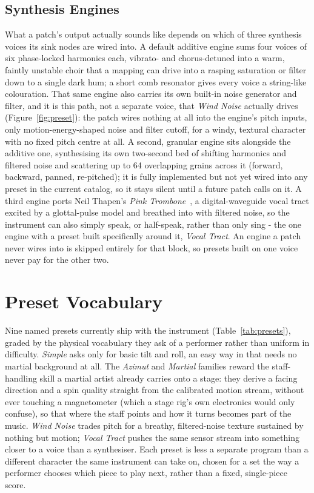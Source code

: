 \documentclass[a4paper,10pt,oneside]{article}
\newcommand{\preset}[1]{\textit{#1}}
\begin{document}
\begin{sloppy}
\subsection{Synthesis Engines}
\label{ssec:engines}

What a patch's output actually sounds like depends on which of three synthesis voices
its sink nodes are wired into. A default additive engine sums four voices of six
phase-locked harmonics each, vibrato- and chorus-detuned into a warm, faintly unstable
choir that a mapping can drive into a rasping saturation or filter down to a single dark
hum; a short comb resonator gives every voice a string-like colouration. That same engine
also carries its own built-in noise generator and filter, and it is this path, not a
separate voice, that \preset{Wind Noise} actually drives (Figure~\ref{fig:preset}): the
patch wires nothing at all into the engine's pitch inputs, only motion-energy-shaped
noise and filter cutoff, for a windy, textural character with no fixed pitch centre at
all. A second, granular engine sits alongside the additive one, synthesising its own
two-second bed of shifting harmonics and filtered noise and scattering up to 64
overlapping grains across it (forward, backward, panned, re-pitched); it is fully
implemented but not yet wired into any preset in the current catalog, so it stays silent
until a future patch calls on it. A third engine ports Neil Thapen's \emph{Pink
Trombone}~\cite{thapen2017pinktrombone}, a digital-waveguide vocal tract excited by a
glottal-pulse model and breathed into with filtered noise, so the instrument can also
simply speak, or half-speak, rather than only sing - the one engine with a preset built
specifically around it, \preset{Vocal Tract}. An engine a patch never wires into is
skipped entirely for that block, so presets built on one voice never pay for the other
two.

\section{Preset Vocabulary}
\label{sec:presets}

Nine named presets currently ship with the instrument (Table~\ref{tab:presets}), graded
by the physical vocabulary they ask of a performer rather than uniform in difficulty.
\preset{Simple} asks only for basic tilt and roll, an easy way in that needs no martial
background at all. The \preset{Azimut} and \preset{Martial} families reward the
staff-handling skill a martial artist already carries onto a stage: they derive a facing
direction and a spin quality straight from the calibrated motion stream, without ever
touching a magnetometer (which a stage rig's own electronics would only confuse), so
that where the staff points and how it turns becomes part of the music. \preset{Wind
Noise} trades pitch for a breathy, filtered-noise texture sustained by nothing but
motion; \preset{Vocal Tract} pushes the same sensor stream into something closer to a
voice than a synthesiser. Each preset is less a separate program than a different
character the same instrument can take on, chosen for a set the way a performer chooses
which piece to play next, rather than a fixed, single-piece score.


\end{sloppy}
\end{document}
